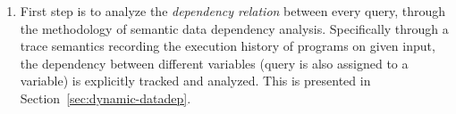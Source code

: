 \begin{enumerate}
\begin{enumerate}
   \item First step is to analyze the \emph{dependency relation} between every query, 
   through the methodology of semantic data dependency analysis.
   Specifically through a trace semantics recording the execution history of programs on given input,
   the dependency between different variables (query is also assigned to a variable) is explicitly tracked and 
   analyzed. This is presented in Section~\ref{sec:dynamic-datadep}.

\end{enumerate}
\end{enumerate}
